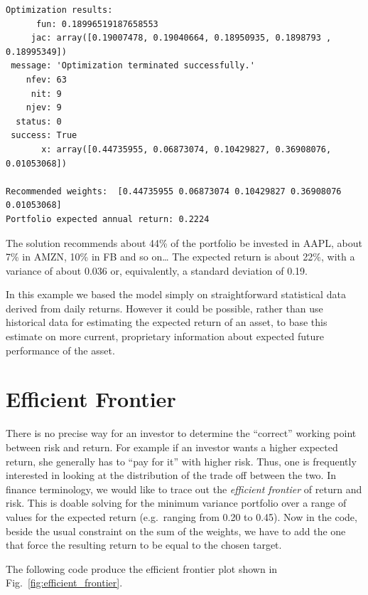\begin{tcolorbox}[breakable, size=fbox, boxrule=1pt, pad at break*=1mm,colback=cellbackground, colframe=cellborder]
\begin{Verbatim}[commandchars=\\\{\}]
Optimization results:
      fun: 0.18996519187658553
     jac: array([0.19007478, 0.19040664, 0.18950935, 0.1898793 , 0.18995349])
 message: 'Optimization terminated successfully.'
    nfev: 63
     nit: 9
    njev: 9
  status: 0
 success: True
       x: array([0.44735955, 0.06873074, 0.10429827, 0.36908076, 0.01053068])

Recommended weights:  [0.44735955 0.06873074 0.10429827 0.36908076 0.01053068]
Portfolio expected annual return: 0.2224
    \end{Verbatim}
\end{tcolorbox}

The solution recommends about 44\% of the portfolio be invested in AAPL,
about 7\% in AMZN, 10\% in FB and so on\ldots{} The expected return is
about 22\%, with a variance of about 0.036 or, equivalently, a standard deviation of 0.19.

In this example we based the model simply on straightforward statistical
data derived from daily returns. However it could be possible, rather
than use historical data for estimating the expected return of an asset,
to base this estimate on more current, proprietary information about
expected future performance of the asset.

\section{Efficient Frontier}\label{efficient-frontier}

There is no precise way for an investor to determine the ``correct''
working point between risk and return. For example if an investor wants
a higher expected return, she generally has to ``pay for it'' with
higher risk. Thus, one is frequently interested in looking at the
distribution of the trade off between the two. In finance terminology, we
would like to trace out the \emph{efficient frontier} of return and
risk. This is doable solving for the minimum variance portfolio over a
range of values for the expected return (e.g.~ranging from 0.20 to
0.45).
Now in the code, beside the usual constraint on the sum of the weights, we have to add the one that force the resulting return to be equal to the chosen target.

The following code produce the efficient frontier plot shown in Fig.~\ref{fig:efficient_frontier}.

